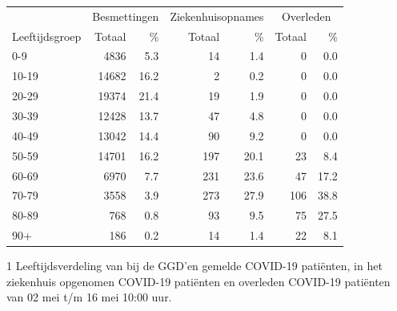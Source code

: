 \documentclass[
  english,
  man,floatsintext]{apa6}
\begin{document}
\begin{table}
\centering\begingroup\fontsize{11}{13}\selectfont

\begin{threeparttable}
\begin{tabular}{lrrrrrr}
\toprule
\multicolumn{1}{c}{ } & \multicolumn{2}{c}{Besmettingen} & \multicolumn{2}{c}{Ziekenhuisopnames} & \multicolumn{2}{c}{Overleden} \\
\cmidrule(l{3pt}r{3pt}){2-3} \cmidrule(l{3pt}r{3pt}){4-5} \cmidrule(l{3pt}r{3pt}){6-7}
Leeftijdsgroep & Totaal & \% & Totaal & \% & Totaal & \%\\
\midrule
0-9 & 4836 & 5.3 & 14 & 1.4 & 0 & 0.0\\
10-19 & 14682 & 16.2 & 2 & 0.2 & 0 & 0.0\\
20-29 & 19374 & 21.4 & 19 & 1.9 & 0 & 0.0\\
30-39 & 12428 & 13.7 & 47 & 4.8 & 0 & 0.0\\
40-49 & 13042 & 14.4 & 90 & 9.2 & 0 & 0.0\\
50-59 & 14701 & 16.2 & 197 & 20.1 & 23 & 8.4\\
60-69 & 6970 & 7.7 & 231 & 23.6 & 47 & 17.2\\
70-79 & 3558 & 3.9 & 273 & 27.9 & 106 & 38.8\\
80-89 & 768 & 0.8 & 93 & 9.5 & 75 & 27.5\\
90+ & 186 & 0.2 & 14 & 1.4 & 22 & 8.1\\
\bottomrule
\end{tabular}
\begin{tablenotes}
\item[1] Leeftijdsverdeling van bij de GGD’en gemelde COVID-19 patiënten, in het ziekenhuis opgenomen COVID-19 patiënten en overleden COVID-19 patiënten van 02 mei t/m 16 mei 10:00 uur.
\end{tablenotes}
\end{threeparttable}
\endgroup{}
\end{table}

\newpage
\end{document}

